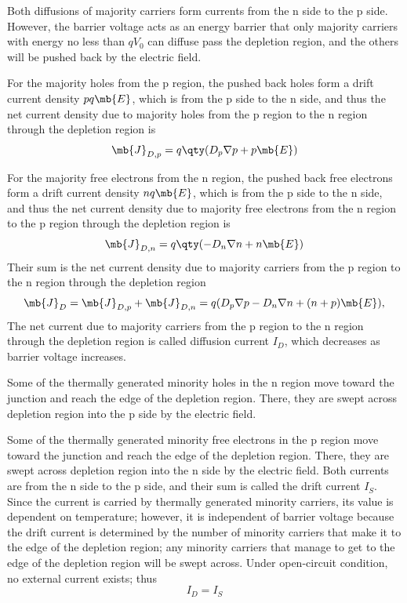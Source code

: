 \documentclass[a4paper,12pt]{article}
\begin{document}
Both diffusions of majority carriers form currents from the n side to the p side. However, the barrier voltage acts as an energy barrier that only majority carriers with energy no less than $qV_0$ can diffuse pass the depletion region, and the others will be pushed back by the electric field.
\bit
\item For the majority holes from the p region, the pushed back holes form a drift current density $pq\mb{E}$, which is from the p side to the n side, and thus the net current density due to majority holes from the p region to the n region through the depletion region is
\[\mb{J}_{D,p}=q\qty(D_p\nabla p+p\mb{E})\]
\item For the majority free electrons from the n region, the pushed back free electrons form a drift current density $nq\mb{E}$, which is from the p side to the n side, and thus the net current density due to majority free electrons from the n region to the p region through the depletion region is
\[\mb{J}_{D,n}=q\qty(-D_n\nabla n+n\mb{E})\]
\eit
Their sum is the net current density due to majority carriers from the p region to the n region through the depletion region
\[\mb{J}_D=\mb{J}_{D,p}+\mb{J}_{D,n}=q(D_p\nabla p-D_n\nabla n+(n+p)\mb{E}),\]
The net current due to majority carriers from the p region to the n region through the depletion region is called diffusion current $I_D$, which decreases as barrier voltage increases. 
\bit
\item Some of the thermally generated minority holes in the n region move toward the junction and reach the edge of the depletion region. There, they are swept across depletion region into the p side by the electric field.
\item Some of the thermally generated minority free electrons in the p region move toward the junction and reach the edge of the depletion region. There, they are swept across depletion region into the n side by the electric field.
\eit
Both currents are from the n side to the p side, and their sum is called the drift current $I_S$. Since the current is carried by thermally generated minority carriers, its value is dependent on temperature; however, it is independent of barrier voltage because the drift current is determined by the number of minority carriers that make it to the edge of the depletion region; any minority carriers that manage to get to the edge of the depletion region will be swept across.
Under open-circuit condition, no external current exists; thus
\[I_D=I_S\]
\end{document}
